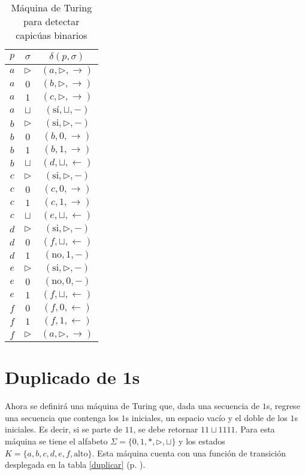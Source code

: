 \documentclass[paper=leter, fontsize=11pt]{scrartcl}
\numberwithin{equation}{section}		%
\numberwithin{figure}{section}			%
\numberwithin{table}{section}				%
\begin{document}
\begin{table}[]
	\caption{Máquina de Turing para detectar capicúas binarios}
	\label{capicua}
	\centering
	\begin{tabular}{cc|c}
	$p$ & $\sigma$ & $\delta(p, \sigma)$ \\ \hline
	$a$ & $\triangleright$ & $(a, \triangleright, \rightarrow)$ \\
	$a$ & $0$ & $(b, \triangleright, \rightarrow)$ \\
	$a$ & $1$ & $(c, \triangleright, \rightarrow)$ \\
	$a$ & $\sqcup$ & $(\text{sí}, \sqcup, -)$ \\
	$b$ & $\triangleright$ & $(\text{si}, \triangleright, -)$ \\
	$b$ & $0$ & $(b, 0, \rightarrow)$ \\
	$b$ & $1$ & $(b, 1, \rightarrow)$ \\
	$b$ & $\sqcup$ & $(d, \sqcup, \leftarrow)$ \\
	$c$ & $\triangleright$ & $(\text{si}, \triangleright, -)$ \\
	$c$ & $0$ & $(c, 0, \rightarrow)$ \\
	$c$ & $1$ & $(c, 1, \rightarrow)$ \\
	$c$ & $\sqcup$ & $(e, \sqcup, \leftarrow)$ \\
	$d$ & $\triangleright$ & $(\text{si}, \triangleright, -)$ \\
	$d$ & $0$ & $(f, \sqcup, \leftarrow)$ \\
	$d$ & $1$ & $(\text{no}, 1, -)$ \\
	$e$ & $\triangleright$ & $(\text{si}, \triangleright, -)$ \\
	$e$ & $0$ & $(\text{no}, 0, -)$ \\
	$e$ & $1$ & $(f, \sqcup, \leftarrow)$ \\
	$f$ & $0$ & $(f, 0, \leftarrow)$ \\
	$f$ & $1$ & $(f, 1, \leftarrow)$ \\
	$f$ & $\triangleright$ & $(a, \triangleright, \rightarrow)$
	\end{tabular}
\end{table}


\section{Duplicado de 1s}

Ahora se definirá una máquina de Turing que, dada una secuencia de $1$s, regrese una secuencia que contenga los $1$s iniciales, un espacio vacío y el doble de los $1$s iniciales. Es decir, si se parte de $11$, se debe retornar $11 \sqcup 1111$. Para esta máquina se tiene el alfabeto $\Sigma = \{ 0, 1, *, \triangleright, \sqcup \}$ y los estados $K = \{ a, b, c, d, e, f, \text{alto} \}$. Esta máquina cuenta con una función de transición desplegada en la tabla \ref{duplicar} (p. \pageref{duplicar}).
\end{document}
